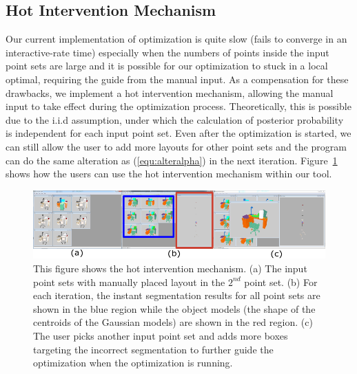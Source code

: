 \subsection{Hot Intervention Mechanism}
%
Our current implementation of optimization is quite slow (fails to converge in an interactive-rate time) especially when the numbers of points inside the input point sets are large and it is possible for our optimization to stuck in a local optimal, requiring the guide from the manual input. 
%
As a compensation for these drawbacks, we implement a hot intervention mechanism, allowing the manual input to take effect during the optimization process. 
Theoretically, this is possible due to the i.i.d assumption, under which the calculation of posterior probability is independent for each input point set. 
%
Even after the optimization is started, we can still allow the user to add more layouts  for other point sets and the program can do the same alteration as (\ref{equ:alteralpha}) in the next iteration. 
%
Figure~\ref{fig:hi} shows how the users can use the hot intervention mechanism within our tool.
%
\begin{figure}[htb]
	\centering
	\includegraphics[width=\linewidth]{images/hotintervention/hi}
	\caption{\label{fig:hi} This figure shows the hot intervention mechanism. (a) The input point sets with manually placed layout in the $2^{nd}$ point set. (b) For each iteration, the instant segmentation results for all point sets are shown in the blue region while the object models (the shape of the centroids of the Gaussian models) are shown in the red region. (c) The user picks another input point set and adds more boxes targeting the incorrect segmentation to further guide the optimization when the optimization is running. }
\end{figure}

